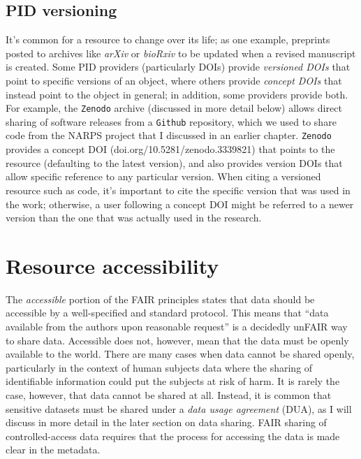 \subsection{PID versioning}

It's common for a resource to change over its life; as one example, preprints posted to archives like \textit{arXiv} or \textit{bioRxiv} to be updated when a revised manuscript is created. Some PID providers (particularly DOIs) provide \textit{versioned DOIs} that point to specific versions of an object, where others provide \textit{concept DOIs} that instead point to the object in general; in addition, some providers provide both.  For example, the \texttt{Zenodo} archive (discussed in more detail below) allows direct sharing of software releases from a \texttt{Github} repository, which we used to share code from the NARPS project that I discussed in an earlier chapter. \texttt{Zenodo} provides a concept DOI (doi.org/10.5281/zenodo.3339821) that points to the resource (defaulting to the latest version), and also provides version DOIs that allow specific reference to any particular version.  When citing a versioned resource such as code, it's important to cite the specific version that was used in the work; otherwise, a user following a concept DOI might be referred to a newer version than the one that was actually used in the research.

\section{Resource accessibility}

The \textit{accessible} portion of the FAIR principles states that data should be accessible by a well-specified and standard protocol.  This means that ``data available from the authors upon reasonable request'' is a decidedly unFAIR way to share data.  Accessible does not, however, mean that the data must be openly available to the world.  There are many cases when data cannot be shared openly, particularly in the context of human subjects data where the sharing of identifiable information could put the subjects at risk of harm.  It is rarely the case, however, that data cannot be shared at all.  Instead, it is common that sensitive datasets must be shared under a \textit{data usage agreement} (DUA), as I will discuss in more detail in the later section on data sharing.  FAIR sharing of controlled-access data requires that the process for accessing the data is made clear in the metadata.

